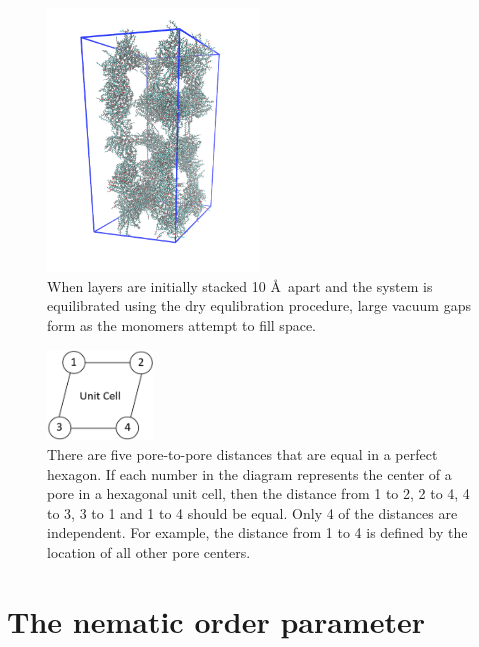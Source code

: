 \documentclass[journal=jpcbfk,manusciprt=article]{achemso}
\begin{document}
	  \begin{figure}[!htb]
		\centering
		\includegraphics[width=0.5\textwidth]{dbwl_10.png}
		\caption{When layers are initially stacked 10 \AA~apart and the system
                is equilibrated using the dry equlibration procedure, large vacuum gaps
		form as the monomers attempt to fill space.}\label{fig:dbwl_10} 
	  \end{figure}



  \begin{figure}[!htb]
	\centering
	\includegraphics[width=0.25\textwidth]{p2p_diagram.png}
	\caption{There are five pore-to-pore distances that are equal in a perfect
		hexagon. If each number in the diagram represents the center of a
		pore in a hexagonal unit cell, then the distance from 1 to 2, 2 to 4, 
		4 to 3, 3 to 1 and 1 to 4 should be equal. Only 4 of the distances
		are independent. For example, the distance from 1 to 4 is defined by
		the location of all other pore centers.}
	\label{fig:p2p_diagram}
  \end{figure}

  \section{The nematic order parameter}\label{method:nematic_order}
\end{document}
